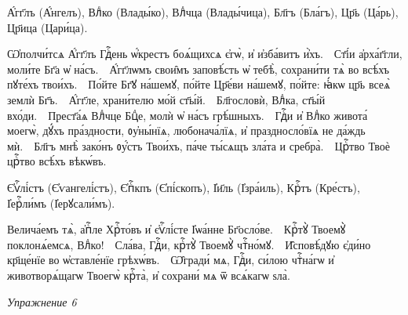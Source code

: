 \documentclass[11pt,a4paper,oneside]{memoir}
\begin{document}
    \begin{slv}
        А҆́гг҃лъ (А҆́нгелъ), Влⷣко (Влады́ко), Влⷣчца (Влады́чица), Бл҃гъ (Бла́гъ), Цр҃ь (Ца́рь), Цр҃ица (Цари́ца).
        
        Ѡ҆полчи́тсѧ А҆́гг҃лъ Гдⷭ҇ень ѡ҆́крестъ боѧ́щихсѧ є҆гѡ̀, и҆ и҆зба́витъ и҆̀хъ.~\textemdash~Ст҃і́и а҆рха́г҃гли, моли́те Бг҃а ѡ҆ на́съ.~\textemdash~А҆́гг҃лѡмъ свои̑мъ заповѣ́сть ѡ҆ тебѣ̀, сохрани́ти тѧ̀ во всѣ́хъ пꙋте́хъ твои́хъ.~\textemdash~По́йте Бг҃ꙋ на́шемꙋ, по́йте Цр҃е́ви на́шемꙋ, по́йте: ꙗ҆́кѡ цр҃ь всеѧ̀ землѝ Бг҃ъ.~\textemdash~А҆́гг҃ле, храни́телю мо́й ст҃ы́й.~\textemdash~Бл҃гословѝ, Влⷣка, ст҃ы́й вхо́ди.~\textemdash~Прест҃а́ѧ Влⷣчце Бцⷣе, молѝ ѡ҆ на́съ грѣ́шныхъ.~\textemdash~Гдⷭ҇и и҆ Влⷣко живота́ моегѡ̀, дꙋ́хъ пра́здности, ᲂу҆ны́нїѧ, любонача́лїѧ, и҆ праздносло́вїѧ не да́ждь мѝ.~\textemdash~Бл҃гъ мнѣ̀ зако́нъ ᲂу҆́стъ Твои́хъ, па́че ты́сѧщъ зла́та и сребра̀.~\textemdash~Црⷭ҇тво Твоѐ црⷭ҇тво всѣ́хъ вѣкѡ́въ.
        
        Є҆ѵⷢ҇лі́стъ (Є҆ѵангелі́стъ), Є҆пⷭ҇кпъ (Є҆пі́скопъ), І҆и҃ль (І҆зра́иль), Крⷭ҇тъ (Кре́стъ), І҆ерⷭ҇ли́мъ (І҆ерꙋсали́мъ).
        
        Велича́емъ тѧ̀, а҆пⷭ҇ле Хрⷭ҇то́въ и҆ є҆ѵⷢ҇лі́сте І҆ѡа́нне Бг҃осло́ве.~\textemdash~Крⷭ҇тꙋ̀ Твоемꙋ̀ поклонѧ́емсѧ, Влⷣко!~\textemdash~Сла́ва, Гдⷭ҇и, крⷭ҇тꙋ̀ Твоемꙋ̀ чтⷭ҇но́мꙋ.~\textemdash~И̑сповѣ́дꙋю є҆ди́но кр҃ще́нїе во ѡ҆ставле́нїе грѣхѡ́въ.~\textemdash~Ѡ̑гради́ мѧ, Гдⷭ҇и, си́лою чтⷭ҇на́гѡ и҆ животворѧ́щагѡ Твоегѡ̀ крⷭ҇та̀, и҆ сохрани́ мѧ ѿ всѧ́кагѡ ѕла̀.
    \end{slv}
    \medskip

    \begin{flushright}
        \emph{Упражнение 6}
    \end{flushright}
\end{document}
